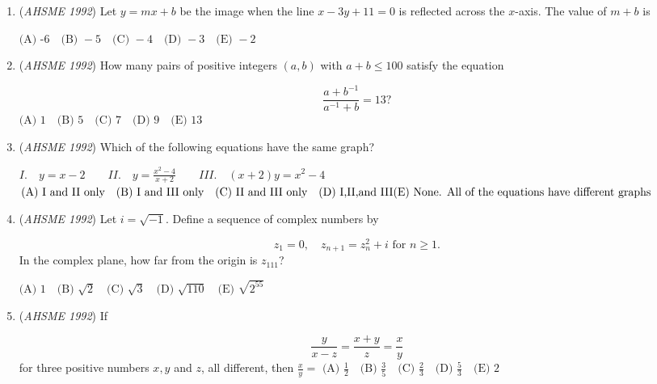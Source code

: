 \begin{enumerate}
 The ratio of the radii of two concentric circles is $1:3$. If $\overline{AC}$ is a diameter of the larger circle, $\overline{BC}$ is a chord of the larger circle that is tangent to the smaller circle, and $AB=12$, then the radius of the larger circle is


 $\text{(A) } 13\quad \text{(B) } 18\quad \text{(C) } 21\quad \text{(D) } 24\quad \text{(E) } 26$


	\item (\textit{AHSME 1992}) Let $y=mx+b$ be the image when the line $x-3y+11=0$ is reflected across the $x$-axis. The value of $m+b$ is


 $\text{(A) -6} \quad \text{(B) } -5\quad \text{(C) } -4\quad \text{(D) } -3\quad \text{(E) } -2$


	\item (\textit{AHSME 1992}) How many pairs of positive integers $(a,b)$ with $a+b\le 100$ satisfy the equation


 
 \[\frac{a+b^{-1}}{a^{-1}+b}=13?\]
$\text{(A) } 1\quad \text{(B) } 5\quad \text{(C) } 7\quad \text{(D) } 9\quad \text{(E) } 13$


	\item (\textit{AHSME 1992}) Which of the following equations have the same graph?


 $I.\quad y=x-2 \qquad II.\quad y=\frac{x^2-4}{x+2}\qquad III.\quad (x+2)y=x^2-4$
$\text{(A) I and II only} \quad \text{(B) I and III only} \quad \text{(C) II and III only} \quad \text{(D) I,II,and III} \quad \\ \text{(E) None. All of the equations have different graphs}$


	\item (\textit{AHSME 1992}) Let $i=\sqrt{-1}$. Define a sequence of complex numbers by


 
 \[z_1=0,\quad z_{n+1}=z_{n}^2+i \text{ for } n\ge1.\]
In the complex plane, how far from the origin is $z_{111}$?


 $\text{(A) } 1\quad \text{(B) } \sqrt{2}\quad \text{(C) } \sqrt{3}\quad \text{(D) } \sqrt{110}\quad \text{(E) } \sqrt{2^{55}}$


	\item (\textit{AHSME 1992}) If

 \[\frac{y}{x-z}=\frac{x+y}{z}=\frac{x}{y}\]
for three positive numbers $x,y$ and $z$, all different, then $\frac{x}{y}=$
$\text{(A) } \frac{1}{2}\quad \text{(B) } \frac{3}{5}\quad \text{(C) } \frac{2}{3}\quad \text{(D) } \frac{5}{3}\quad \text{(E) } 2$



\end{enumerate}
